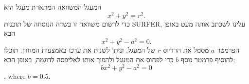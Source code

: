 \begin{surferPage}[Circle]{המעגל}
המשוואה המתארת מעגל היא
\[x^2+y^2=r^2.\]
כדי לרשום משוואה זו בשדה הנוסחה של תוכנית SURFER, עלינו לשכתב אותה מעט באופן הבא
\[x^2+y^2-a^2=0.\]
הפרמטר $a$ מסמל את הרדיוס $r$ של המעגל, וניתן לשנות את ערכו באמצעות המחוון. תוכלו להוסיף פרמטר נוסף $b$ כדי לפחוס את המעגל ולהפוך אותו לאליפסה לדוגמה, באופן הבא:
\[bx^2+y^2-a^2=0\], where $b=0.5$.
\end{surferPage}
